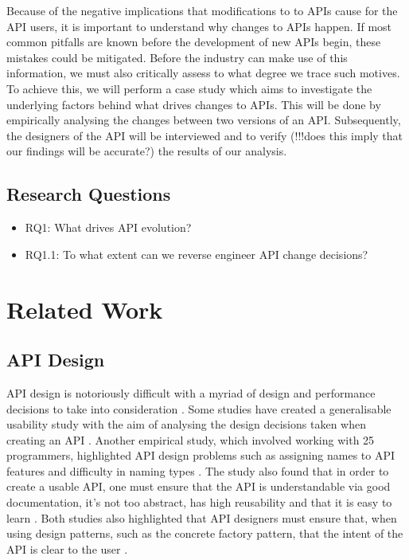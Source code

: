 \documentclass[10pt,twocolumn]{article}
\begin{document}
Because of the negative implications that modifications to to APIs cause for the API users, it is important to understand why changes to APIs happen. If most common pitfalls are known before the development of new APIs begin, these mistakes could be mitigated. Before the industry can make use of this information, we must also critically assess to what degree we trace such motives. To achieve this, we will perform a case study which aims to investigate the underlying factors behind what drives changes to APIs. This will be done by empirically analysing the changes between two versions of an API. Subsequently, the designers of the API will be interviewed and to verify (!!!does this imply that our findings will be accurate?) the results of our analysis. 

\subsection{Research Questions}
\begin{itemize}
\item RQ1: What drives API evolution? 
\item RQ1.1: To what extent can we reverse engineer API change decisions?
\end{itemize}


\section{Related Work}

\subsection{API Design}

API design is notoriously difficult with a myriad of design and performance decisions to take into consideration \cite{!!! MS, Design Doc}. Some studies have created a generalisable usability study with the aim of analysing the design decisions taken when creating an API \cite{}. Another empirical study, which involved working with 25 programmers, highlighted API design problems such as assigning names to API features and difficulty in naming types \cite{An Empirical Study of API Usability}. The study also found that in order to create a usable API, one must ensure that the API is understandable via good documentation, it’s not too abstract, has high reusability and that it is easy to learn \cite{API Usability}. Both studies also highlighted that API designers must ensure that, when using design patterns, such as the concrete factory pattern, that the intent of the API is clear to the user \cite{both}.
\end{document}

